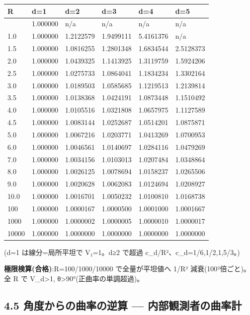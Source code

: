 \documentclass[
]{ltjsarticle}
\newcounter{none} %
\begin{document}
{\def\LTcaptype{none} %
\begin{longtable}[]{@{}llllll@{}}
\toprule\noalign{}
R & d=1 & d=2 & d=3 & d=4 & d=5 \\
\midrule\noalign{}
\endhead
\bottomrule\noalign{}
\endlastfoot
0.5 & 1.000000 & n/a & n/a & n/a & n/a \\
1.0 & 1.000000 & 1.2122579 & 1.9499111 & 5.4161376 & n/a \\
1.5 & 1.000000 & 1.0816255 & 1.2801348 & 1.6834544 & 2.5128373 \\
2.0 & 1.000000 & 1.0439325 & 1.1413925 & 1.3119759 & 1.5924206 \\
2.5 & 1.000000 & 1.0275733 & 1.0864041 & 1.1834234 & 1.3302164 \\
3.0 & 1.000000 & 1.0189503 & 1.0585685 & 1.1219513 & 1.2139814 \\
3.5 & 1.000000 & 1.0138368 & 1.0424191 & 1.0873448 & 1.1510492 \\
4.0 & 1.000000 & 1.0105516 & 1.0321808 & 1.0657975 & 1.1127589 \\
4.5 & 1.000000 & 1.0083144 & 1.0252687 & 1.0514201 & 1.0875871 \\
5.0 & 1.000000 & 1.0067216 & 1.0203771 & 1.0413269 & 1.0700953 \\
6.0 & 1.000000 & 1.0046561 & 1.0140697 & 1.0284116 & 1.0479269 \\
7.0 & 1.000000 & 1.0034156 & 1.0103013 & 1.0207484 & 1.0348864 \\
8.0 & 1.000000 & 1.0026125 & 1.0078694 & 1.0158237 & 1.0265506 \\
9.0 & 1.000000 & 1.0020628 & 1.0062083 & 1.0124694 & 1.0208927 \\
10.0 & 1.000000 & 1.0016701 & 1.0050232 & 1.0100810 & 1.0168738 \\
100 & 1.000000 & 1.0000167 & 1.0000500 & 1.0001000 & 1.0001667 \\
1000 & 1.000000 & 1.0000002 & 1.0000005 & 1.0000010 & 1.0000017 \\
10000 & 1.000000 & 1.0000000 & 1.0000000 & 1.0000000 & 1.0000000 \\
\end{longtable}
}

(d=1 は線分=局所平坦で V₁=1。d≥2 で超過 c\_d/R²、c\_d=1/6,1/2,1,5/3。)

\textbf{極限検算(合格)}:R=100/1000/10000 で全量が平坦値へ 1/R²
減衰(100²倍ごと)。全 R で V\_d\textgreater1,
θ\textgreater90°(正曲率の単調超過)。

\subsection{4.5 角度からの曲率の逆算 ---
内部観測者の曲率計}\label{ux89d2ux5ea6ux304bux3089ux306eux66f2ux7387ux306eux9006ux7b97-ux5185ux90e8ux89b3ux6e2cux8005ux306eux66f2ux7387ux8a08}
\end{document}
